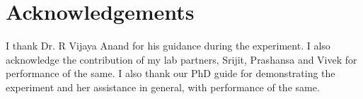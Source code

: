 	
\section{Acknowledgements}
I thank Dr. R Vijaya Anand for his guidance during the experiment. I also acknowledge the contribution of my lab partners, Srijit, Prashansa and Vivek for performance of the same. I also thank our PhD guide for demonstrating the experiment and her assistance in general, with performance of the same.


